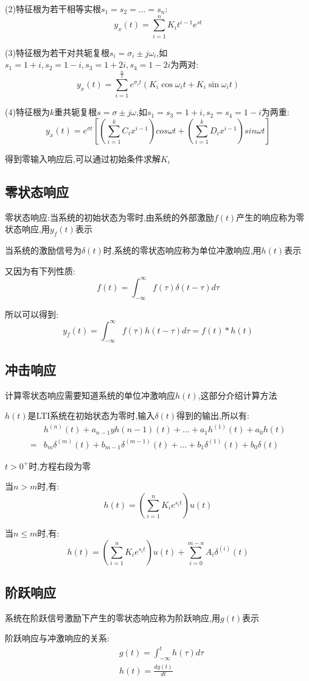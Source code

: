 \documentclass[12pt, a4paper, oneside]{ctexart}
\begin{document}
(2)特征根为若干相等实根$s_1=s_2=...=s_n$:
\[
    y_x(t)=\sum_{i=1}^{n}K_it^{i-1}e^{st}
\]

(3)特征根为若干对共轭复根$s_i=\sigma_i \pm j\omega_i$,如$s_1=1+i,s_2=1-i,s_3=1+2i,s_4=1-2i$为两对:
\[
    y_x(t)=\sum_{i=1}^{\frac{n}{2}}e^{\sigma_i t}(K_i\cos \omega_i t+K_i\sin \omega_i t)
\]

(4)特征根为$k$重共轭复根$s=\sigma \pm j\omega$,如$s_1=s_3=1+i,s_2=s_4=1-i$为两重:
\[
    y_x(t)=e^{\sigma t}\left[\left(\sum_{i=1}^{k}C_ix^{i-1}\right)cos \omega t + \left(\sum_{i=1}^{k}D_ix^{i-1}\right)sin\omega t\right]
\]

得到零输入响应后,可以通过初始条件求解$K_i$

\subsection{零状态响应}
零状态响应:当系统的初始状态为零时,由系统的外部激励$f(t)$产生的响应称为零状态响应,用$y_f(t)$表示

当系统的激励信号为$\delta(t)$时,系统的零状态响应称为单位冲激响应,用$h(t)$表示

又因为有下列性质:
\[
    f(t)=\int_{-\infty}^{\infty}f(\tau)\delta(t-\tau)d\tau
\]

所以可以得到:
\[
    y_f(t)=\int_{-\infty}^{\infty}f(\tau)h(t-\tau)d\tau=f(t)\ast h(t)
\]

\subsection{冲击响应}
计算零状态响应需要知道系统的单位冲激响应$h(t)$,这部分介绍计算方法

$h(t)$是LTI系统在初始状态为零时,输入$\delta(t)$得到的输出,所以有:
\begin{align*}
    &h^{(n)}(t)+a_{n-1}yh{(n-1)}(t)+...+a_1h^{(1)}(t)+a_0h(t)\\
    = &b_m\delta^{(m)}(t)+b_{m-1}\delta^{(m-1)}(t)+...+b_1\delta^{(1)}(t)+b_0\delta(t)
\end{align*}

$t>0^+$时,方程右段为零

当$n>m$时,有:
\[
    h(t)=\left(\sum_{i=1}^{n}K_ie^{s_it}\right)u(t)
\]

当$n \leqslant m$时,有:
\[
    h(t)=\left(\sum_{i=1}^{n}K_ie^{s_it}\right)u(t)+\sum_{i=0}^{m-n}A_i\delta^{(i)}(t)
\]

\subsection{阶跃响应}
系统在阶跃信号激励下产生的零状态响应称为阶跃响应,用$g(t)$表示

阶跃响应与冲激响应的关系:
\begin{align*}
    &g(t)=\int_{-\infty}^{t}h(\tau)d\tau\\
    &h(t)=\frac{dg(t)}{dt}
\end{align*}
\end{document}
